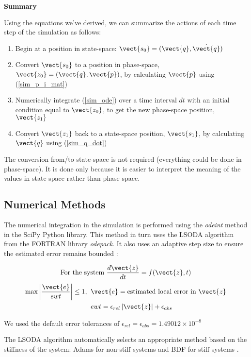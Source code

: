 \textbf{Summary}

Using the equations we've derived, we can summarize the actions of each time step of the simulation as follows:

\begin{enumerate}
    \item Begin at a position in state-space: $\vect{s_0} = (\vect{q}, \Dot{\vect{q}})$
    \item Convert $\vect{s_0}$ to a position in phase-space, $\vect{z_0} = (\vect{q}, \vect{p})$, by calculating $\vect{p}$ using (\ref{sim_p_i_mat})
    \item Numerically integrate (\ref{sim_ode}) over a time interval $d t$ with an initial condition equal to $\vect{z_0}$, to get the new phase-space position, $\vect{z_1}$
    \item Convert $\vect{z_1}$ back to a state-space position, $\vect{s_1}$, by calculating $\Dot{\vect{q}}$ using (\ref{sim_q_dot})
\end{enumerate}

The conversion from/to state-space is not required (everything could be done in phase-space). It is done only because it is easier to interpret the meaning of the values in state-space rather than phase-space.

\subsection{Numerical Methods}

The numerical integration in the simulation is performed using the \textit{odeint} method in the SciPy Python library. This method in turn uses the LSODA algorithm from the FORTRAN library \textit{odepack}. It also uses an adaptive step size to ensure the estimated error remains bounded \cite{scipy}:

\begin{align*}
    \text{For the system } \frac{d \vect{z}}{d t} = f(\vect{z}, t)
\end{align*}
\begin{align*}
    \max \left| \frac{\vect{e}}{e w t} \right| \leq 1 ,\;\; &\vect{e} = \text{estimated local error in } \vect{z}\\
    &e w t = \epsilon_{rel} \left|\vect{z}\right| + \epsilon_{abs}
\end{align*}

We used the default error tolerances of $\epsilon_{rel} = \epsilon_{abs} = 1.49012 \times 10^{-8}$

The LSODA algorithm automatically selects an appropriate method based on the stiffness of the system: Adams for non-stiff systems and BDF for stiff systems \cite{lsoda}.
